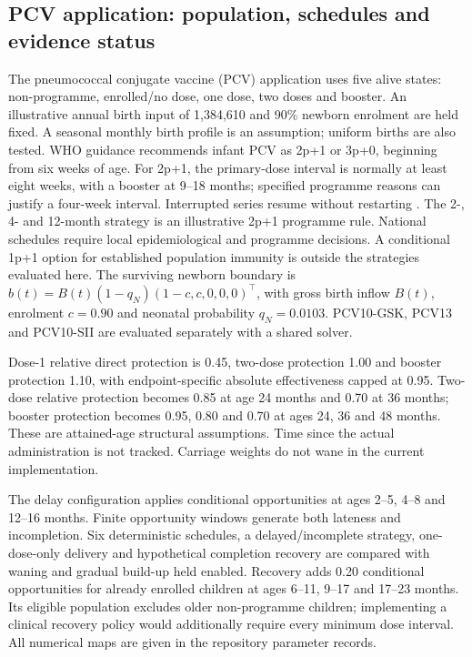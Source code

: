 \documentclass[10pt,letterpaper]{article}
\begin{document}
\subsection{PCV application: population, schedules and evidence status}
The pneumococcal conjugate vaccine (PCV) application uses five alive states: non-programme, enrolled/no dose, one dose, two doses and booster. An illustrative annual birth input of 1,384,610 and 90\% newborn enrolment are held fixed. A seasonal monthly birth profile is an assumption; uniform births are also tested. WHO guidance recommends infant PCV as 2p+1 or 3p+0, beginning from six weeks of age. For 2p+1, the primary-dose interval is normally at least eight weeks, with a booster at 9--18 months; specified programme reasons can justify a four-week interval. Interrupted series resume without restarting \cite{WHO2025,WHOSchedule}. The 2-, 4- and 12-month strategy is an illustrative 2p+1 programme rule. National schedules require local epidemiological and programme decisions. A conditional 1p+1 option for established population immunity is outside the strategies evaluated here. The surviving newborn boundary is $b(t)=B(t)(1-q_N)(1-c,c,0,0,0)^\top$, with gross birth inflow $B(t)$, enrolment $c=0.90$ and neonatal probability $q_N=0.0103$. PCV10-GSK, PCV13 and PCV10-SII are evaluated separately with a shared solver.

Dose-1 relative direct protection is 0.45, two-dose protection 1.00 and booster protection 1.10, with endpoint-specific absolute effectiveness capped at 0.95. Two-dose relative protection becomes 0.85 at age 24 months and 0.70 at 36 months; booster protection becomes 0.95, 0.80 and 0.70 at ages 24, 36 and 48 months. These are attained-age structural assumptions. Time since the actual administration is not tracked. Carriage weights do not wane in the current implementation.

The delay configuration applies conditional opportunities at ages 2--5, 4--8 and 12--16 months. Finite opportunity windows generate both lateness and incompletion. Six deterministic schedules, a delayed/incomplete strategy, one-dose-only delivery and hypothetical completion recovery are compared with waning and gradual build-up held enabled. Recovery adds 0.20 conditional opportunities for already enrolled children at ages 6--11, 9--17 and 17--23 months. Its eligible population excludes older non-programme children; implementing a clinical recovery policy would additionally require every minimum dose interval. All numerical maps are given in the repository parameter records.
\end{document}
